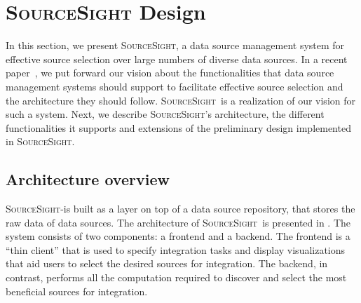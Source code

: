 \documentclass{vldb}
\newcommand\system{\textsc{SourceSight}}
\begin{document}
%
%
%
%
%
%
%
%
%
%

\section{{\Large \system} Design}
In this section, we present \system, a data source management system for effective source selection over large numbers of diverse data sources. In a recent paper~\cite{rekatsinas:2015}, we put forward our vision about the functionalities that data source management systems should support to facilitate effective source selection and the architecture they should follow. 
\system~is a realization of our vision for such a system. Next, we describe \system's architecture, the different functionalities it supports and extensions of the preliminary design implemented in \system.%

\subsection{Architecture overview}
\system-is built as a layer on top of a data source repository, that stores the raw data of data sources. The architecture of \system~is presented in . The system consists of two components: a frontend and a backend. The frontend is a ``thin client'' that is used to specify integration tasks and display visualizations that aid users to select the desired sources for integration. The backend, in contrast, performs all the computation required to discover and select the most beneficial sources for integration.
\end{document}
